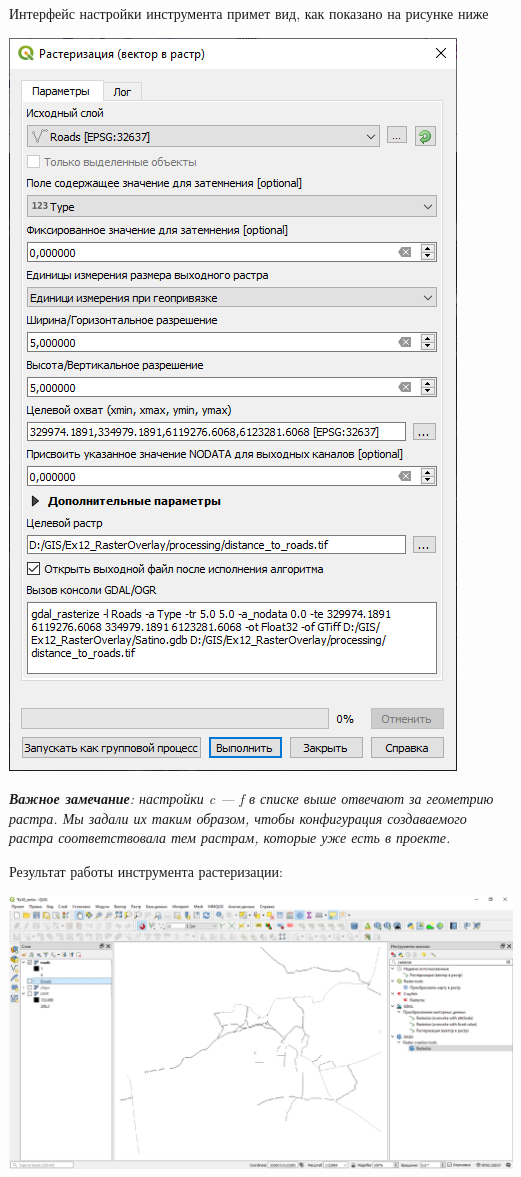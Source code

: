 \documentclass[
  12pt,
]{book}
\begin{document}
\begin{enumerate}
  Интерфейс настройки инструмента примет вид, как показано на рисунке ниже

  \includegraphics{images/Ex12/distance_settings.png}

  \emph{\textbf{Важное замечание}: настройки c --- f в списке выше отвечают за геометрию растра. Мы задали их таким образом, чтобы конфигурация создаваемого растра соответствовала тем растрам, которые уже есть в проекте.}

  Результат работы инструмента растеризации:

  \includegraphics{images/Ex12/roads_raster.png}


\end{enumerate}
\end{document}
